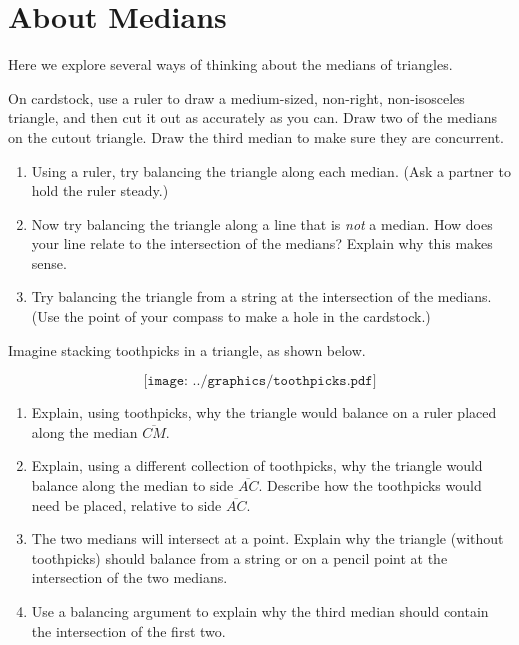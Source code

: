 \newpage

\section{About Medians}
Here we explore several ways of thinking about the medians of triangles.  

\begin{prob}  
On cardstock, use a ruler to draw a medium-sized, non-right, non-isosceles triangle, and then cut it out as accurately as you can.  Draw two of the medians on the cutout triangle.  Draw the third median to make sure they are concurrent.  
\begin{enumerate}
\item Using a ruler, try balancing the triangle along each median.  (Ask a partner to hold the ruler steady.)  
\item Now try balancing the triangle along a line that is \emph{not} a median.  How does your line relate to the intersection of the medians?  Explain why this makes sense.  
\item Try balancing the triangle from a string at the intersection of the medians.  (Use the point of your compass to make a hole in the cardstock.)
\end{enumerate}

\end{prob}

\begin{prob}
Imagine stacking toothpicks in a triangle, as shown below.  

$$\texttt{[image: ../graphics/toothpicks.pdf]}$$

\begin{enumerate}
\item Explain, using toothpicks, why the triangle would balance on a ruler placed along the median $\overline{CM}$.  
\item Explain, using a different collection of toothpicks, why the triangle would balance along the median to side $\overline{AC}$.  Describe how the toothpicks would need be placed, relative to side $\overline{AC}$.
\item The two medians will intersect at a point.  Explain why the triangle (without toothpicks) should balance from a string or on a pencil point at the intersection of the two medians.  
\item Use a balancing argument to explain why the third median should contain the intersection of the first two.  
\end{enumerate}
\end{prob}

